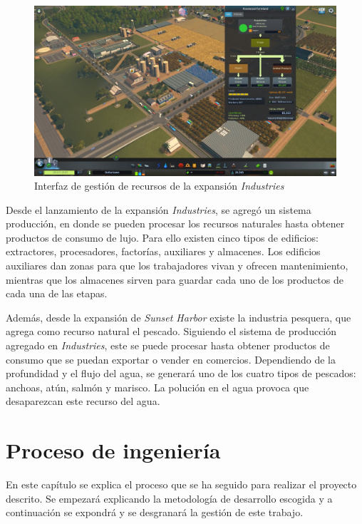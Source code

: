 \begin{figure}[!h]
	\centering
	\includegraphics[width=\textwidth]{images/industries}
	\caption{Interfaz de gestión de recursos de la expansión \textit{Industries}}
	\label{fig:industry}
\end{figure}


Desde el lanzamiento de la expansión \textit{Industries}, se agregó un sistema producción, en donde se pueden procesar los recursos naturales hasta obtener productos de consumo de lujo. Para ello existen cinco tipos de edificios: extractores, procesadores, factorías, auxiliares y almacenes. Los edificios auxiliares dan zonas para que los trabajadores vivan y ofrecen mantenimiento, mientras que los almacenes sirven para guardar cada uno de los productos de cada una de las etapas.

Además, desde la expansión de \textit{Sunset Harbor} existe la industria pesquera, que agrega como recurso natural el pescado. Siguiendo el sistema de producción agregado en \textit{Industries}, este se puede procesar hasta obtener productos de consumo que se puedan exportar o vender en comercios. Dependiendo de la profundidad y el flujo del agua, se generará uno de los cuatro tipos de pescados: anchoas, atún, salmón y marisco. La polución en el agua provoca que desaparezcan este recurso del agua.

\section{Proceso de ingeniería}

En este capítulo se explica el proceso que se ha seguido para realizar el proyecto descrito. Se empezará explicando la metodología de desarrollo escogida y a continuación se expondrá y se desgranará la gestión de este trabajo.

